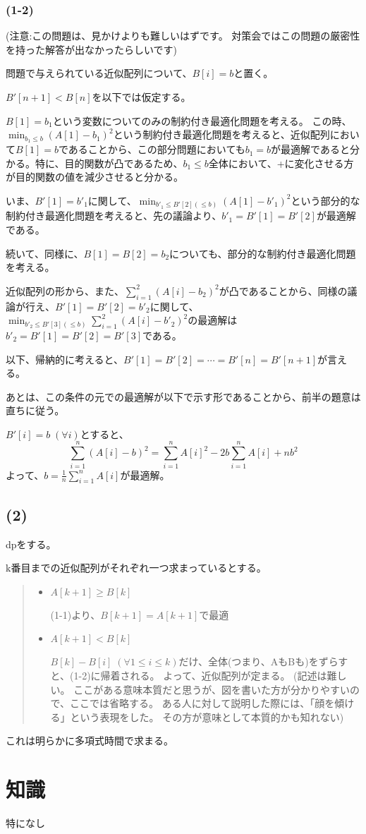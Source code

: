 \documentclass[a4paper, 10pt, dvipdfmx]{jlreq}
\begin{document}
\subsubsection*{(1-2)}

(注意:この問題は、見かけよりも難しいはずです。
対策会ではこの問題の厳密性を持った解答が出なかったらしいです)

問題で与えられている近似配列について、$B[i]=b$と置く。

$B'[n+1]<B[n]$を以下では仮定する。

$B[1]=b_1$という変数についてのみの制約付き最適化問題を考える。
この時、$\min_{b_1\leq b}(A[1]-b_1)^2$という制約付き最適化問題を考えると、近似配列において$B[1]=b$であることから、この部分問題においても$b_1=b$が最適解であると分かる。特に、目的関数が凸であるため、$b_1 \leq b$全体において、+に変化させる方が目的関数の値を減少させると分かる。

いま、$B'[1]=b'_1$に関して、$\min_{b'_1 \leq B'[2] (\leq b)}(A[1]-b'_1)^2$という部分的な制約付き最適化問題を考えると、先の議論より、$b'_1=B'[1]=B'[2]$が最適解である。

続いて、同様に、$B[1]=B[2]=b_2$についても、部分的な制約付き最適化問題を考える。

近似配列の形から、また、$\sum_{i=1}^{2}(A[i]-b_2)^2$が凸であることから、同様の議論が行え、$B'[1]=B'[2]=b'_2$に関して、$\min_{b'_2\leq B'[3](\leq b)}\sum_{i=1}^{2}(A[i]-b'_2)^2$の最適解は$b'_2=B'[1]=B'[2]=B'[3]$である。

以下、帰納的に考えると、$B'[1]=B'[2]=\cdots=B'[n]=B'[n+1]$が言える。

あとは、この条件の元での最適解が以下で示す形であることから、前半の題意は直ちに従う。

$B'[i]=b \; (\forall i)$とすると、
\begin{equation*}
  \sum_{i=1}^{n}{(A[i]-b)^2} = \sum_{i=1}^{n}{A[i]^2} -2b \sum_{i=1}^{n}{A[i]} + nb^2
\end{equation*}
よって、$b=\frac{1}{n}\sum_{i=1}^{n}{A[i]}$が最適解。

\subsection*{(2)}

dpをする。

k番目までの近似配列がそれぞれ一つ求まっているとする。

\begin{quote}
  \begin{itemize}
    \item  $A[k+1] \geq B[k]$

          (1-1)より、$B[k+1]=A[k+1]$で最適

    \item  $A[k+1] < B[k]$

          $B[k]-B[i] \; (\forall 1 \leq i \leq k)$だけ、全体(つまり、AもBも)をずらすと、(1-2)に帰着される。
          よって、近似配列が定まる。
          (記述は難しい。
          ここがある意味本質だと思うが、図を書いた方が分かりやすいので、ここでは省略する。
          ある人に対して説明した際には、「顔を傾ける」という表現をした。
          その方が意味として本質的かも知れない)
  \end{itemize}
\end{quote}

これは明らかに多項式時間で求まる。

\section{知識}

特になし
\end{document}

